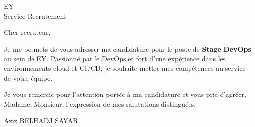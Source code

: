 \documentclass[11pt,a4paper]{letter}
\newcommand{\CandidateName}{Aziz BELHADJ SAYAR}
\newcommand{\CompanyName}{EY}
\newcommand{\Position}{Stage DevOps}
\begin{document}
\begin{letter}{\CompanyName \\ Service Recrutement}

\opening{Cher recruteur,}

Je me permets de vous adresser ma candidature pour le poste de \textbf{\Position} au sein de \CompanyName.  
Passionné par le DevOps et fort d’une expérience dans les environnements cloud et CI/CD, je souhaite mettre mes compétences au service de votre équipe.

Je vous remercie pour l’attention portée à ma candidature et vous prie d’agréer, Madame, Monsieur, l’expression de mes salutations distinguées.

\closing{\CandidateName}

\end{letter}
\end{document}
